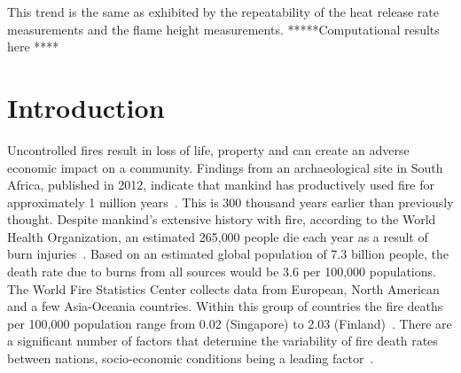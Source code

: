 \documentclass[twoside]{uocthesis}
\begin{document}
{This trend is the same as exhibited by the repeatability of the heat release rate measurements and the flame height measurements.   *****Computational results here ****

}

\tableofcontents

\listoffigures

\listoftables


\textpages

\chapter{Introduction}
\label{chapter:Introduction}

Uncontrolled fires result in loss of life, property and can create an adverse economic impact on a community.  Findings from an archaeological site in South Africa, published in 2012, indicate that mankind has productively used fire for approximately 1 million years~\cite{Berna:2012}.  This is 300 thousand years earlier than previously thought.  Despite mankind’s extensive history with fire, according to the World Health Organization, an estimated 265,000 people die each year as a result of burn injuries~\cite{WHO:2014}.  Based on an estimated global population of 7.3 billion people, the death rate due to burns from all sources would be 3.6 per 100,000 populations.  The World Fire Statistics Center collects data from European, North American and a few Asia-Oceania countries.  Within this group of countries the fire deaths per 100,000 population range from 0.02 (Singapore) to 2.03 (Finland)~\cite{Climate:2014}. There are a significant number of factors that determine the variability of fire death rates between nations, socio-economic conditions being a leading factor~\cite{WHO:2014}.
\end{document}
